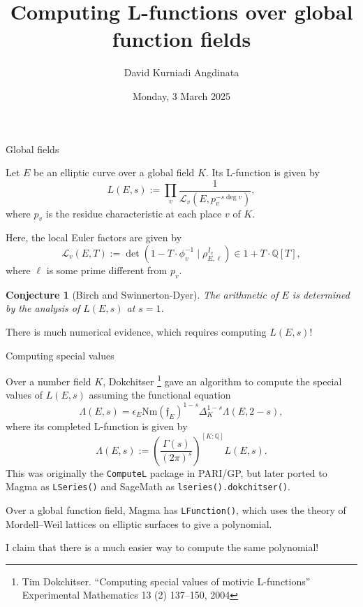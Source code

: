\documentclass[10pt]{beamer}
\title{Computing L-functions over global function fields}
\author{David Kurniadi Angdinata}
\institute{London School of Geometry and Number Theory}
\date{Monday, 3 March 2025}
\newtheorem{conjecture}{Conjecture}
\begin{document}
\frame{\titlepage}

\begin{frame}[t]{Global fields}

Let $ E $ be an elliptic curve over a global field $ K $. Its L-function is given by
$$ L(E, s) := \prod_v \dfrac{1}{\mathcal{L}_v(E, p_v^{-s\deg v})}, $$
where $ p_v $ is the residue characteristic at each place $ v $ of $ K $.

\pause

\vspace{0.5cm} Here, the local Euler factors are given by
$$ \mathcal{L}_v(E, T) := \det(1 - T \cdot \phi_v^{-1} \mid \rho_{E, \ell}^{I_v}) \in 1 + T \cdot \mathbb{Q}[T], $$
where $ \ell $ is some prime different from $ p_v $.

\pause

\vspace{0.5cm}

\begin{conjecture}[Birch and Swinnerton-Dyer]
The arithmetic of $ E $ is determined by the analysis of $ L(E, s) $ at $ s = 1 $.
\end{conjecture}

\vspace{0.5cm} There is much numerical evidence, which requires computing $ L(E, s) $!

\end{frame}

\begin{frame}[t]{Computing special values}

Over a number field $ K $, Dokchitser \footnote{Tim Dokchitser. ``Computing special values of motivic L-functions'' Experimental Mathematics 13 (2) 137--150, 2004} gave an algorithm to compute the special values of $ L(E, s) $ assuming the functional equation
$$ \Lambda(E, s) = \epsilon_E\mathrm{Nm}(\mathfrak{f}_E)^{1 - s}\Delta_K^{1 - s}\Lambda(E, 2 - s), $$
where its completed L-function is given by
$$ \Lambda(E, s) := \left(\dfrac{\Gamma(s)}{(2\pi)^s}\right)^{[K : \mathbb{Q}]}L(E, s). $$
This was originally the \texttt{ComputeL} package in PARI/GP, but later ported to Magma as \texttt{LSeries()} and SageMath as \texttt{lseries().dokchitser()}.

\pause

\vspace{0.5cm} Over a global function field, Magma has \texttt{LFunction()}, which uses the theory of Mordell--Weil lattices on elliptic surfaces to give a polynomial.

\vspace{0.5cm} I claim that there is a much easier way to compute the same polynomial!

\end{frame}
\end{document}
